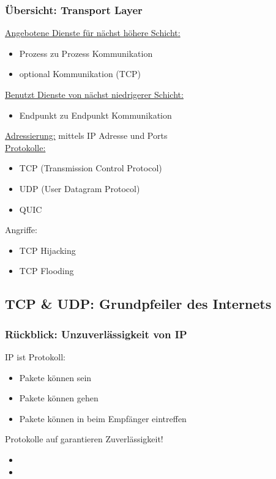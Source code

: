 \subsubsection*{Übersicht: Transport Layer}
\underline{Angebotene Dienste für nächst höhere Schicht:}
\begin{itemize}
    \item Prozess zu Prozess Kommunikation
    \item optional  Kommunikation (TCP)
\end{itemize}
\underline{Benutzt Dienste von nächst niedrigerer Schicht:}
\begin{itemize}
    \item Endpunkt zu Endpunkt Kommunikation
\end{itemize}
\underline{Adressierung:} mittels IP Adresse und Ports\\
\underline{Protokolle:}
\begin{itemize}
    \item TCP (Transmission Control Protocol)
    \item UDP (User Datagram Protocol)
    \item QUIC
\end{itemize}
Angriffe:
\begin{itemize}
    \item TCP Hijacking
    \item TCP Flooding
\end{itemize}
\subsection{TCP \& UDP: Grundpfeiler des Internets}
\subsubsection*{Rückblick: Unzuverlässigkeit von IP}
IP ist  Protokoll:
\begin{itemize}
    \item Pakete können  sein
    \item Pakete können  gehen
    \item Pakete können in  beim Empfänger eintreffen
\end{itemize}
Protokolle auf  garantieren Zuverlässigkeit!
\begin{itemize}
    \item {}
    \item {}
\end{itemize}
